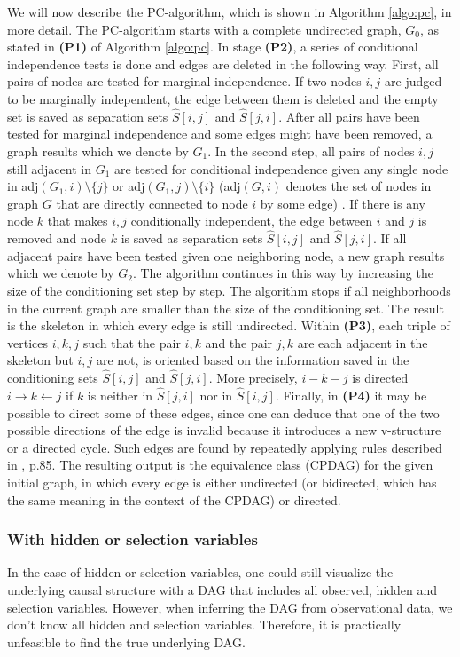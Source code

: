 \documentclass[article]{jss}
\begin{document}
We will now describe the PC-algorithm, which is shown in Algorithm
\ref{algo:pc}, in more detail. The PC-algorithm starts with a complete
undirected graph, $G_0$, as stated in \textbf{(P1)} of Algorithm
\ref{algo:pc}. In stage \textbf{(P2)}, a series of conditional independence
tests is done and edges are deleted in the following way. First, all pairs
of nodes are tested for marginal independence. If two nodes $i,j$ are
judged to be marginally independent, the edge between them is deleted and
the empty set is saved as separation sets $\hat{S}[i,j]$ and
$\hat{S}[j,i]$. After all pairs have been tested for marginal independence
and some edges might have been removed, a graph results which we denote by
$G_1$. In the second step, all pairs of nodes $i,j$ still adjacent in $G_1$
are tested for conditional independence given any single node in
adj$(G_1,i)\setminus \{j\}$ or adj$(G_1,j)\setminus \{i\}$ (adj$(G,i)$
denotes the set of nodes in graph $G$ that are directly connected to node
$i$ by some edge) . If there is any node $k$ that makes $i,j$ conditionally
independent, the edge between $i$ and $j$ is removed and node $k$ is saved
as separation sets $\hat{S}[i,j]$ and $\hat{S}[j,i]$. If all adjacent pairs
have been tested given one neighboring node, a new graph results which we
denote by $G_2$. The algorithm continues in this way by increasing the size
of the conditioning set step by step. The algorithm stops if all
neighborhoods in the current graph are smaller than the size of the
conditioning set. The result is the skeleton in which every edge is still
undirected. Within \textbf{(P3)}, each triple of vertices $i,k,j$ such that
the pair $i,k$ and the pair $j,k$ are each adjacent in the skeleton but
$i,j$ are not, is oriented based on the information saved in the
conditioning sets $\hat{S}[i,j]$ and $\hat{S}[j,i]$. More precisely,
$i-k-j$ is directed $i \rightarrow k \leftarrow j$ if $k$ is neither in
$\hat{S}[j,i]$ nor in $\hat{S}[i,j]$. Finally, in \textbf{(P4)} it may be
possible to direct some of these edges, since one can deduce that one of
the two possible directions of the edge is invalid because it introduces a
new v-structure or a directed cycle. Such edges are found by repeatedly
applying rules described in \cite{SpirtesEtAl00}, p.85. The resulting output is the
equivalence class (CPDAG) for the given initial graph, in which every edge
is either undirected (or bidirected, which has the same meaning in the
context of the CPDAG) or directed.

\subsubsection{With hidden or selection variables}
In the case of hidden or selection variables, one could still visualize the
underlying causal structure with a DAG that includes all observed, hidden
and selection variables. However, when inferring the DAG from observational
data, we don't know all hidden and selection variables. Therefore, it is
practically unfeasible to find the true underlying DAG. 
\end{document}
